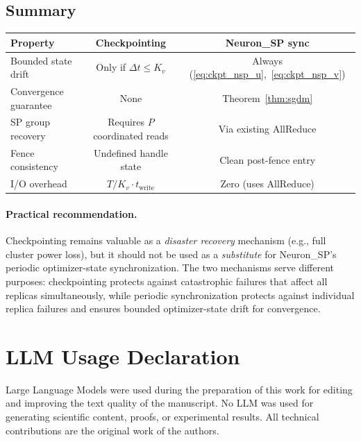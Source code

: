 \documentclass{article}
\begin{document}
\subsection{Summary}
\label{sec:checkpoint_summary}

\begin{center}
\begin{tabular}{lcc}
\toprule
\textbf{Property} & \textbf{Checkpointing} & \textbf{Neuron\_SP sync} \\
\midrule
Bounded state drift & Only if $\Delta t \leq K_v$ & Always (\eqref{eq:ckpt_nsp_u},~\eqref{eq:ckpt_nsp_v}) \\
Convergence guarantee & None & Theorem~\ref{thm:sgdm} \\
SP group recovery & Requires $P$ coordinated reads & Via existing AllReduce \\
Fence consistency & Undefined handle state & Clean post-fence entry \\
I/O overhead & $T/K_v \cdot t_{\text{write}}$ & Zero (uses AllReduce) \\
\bottomrule
\end{tabular}
\end{center}

\paragraph{Practical recommendation.}
Checkpointing remains valuable as a \emph{disaster recovery} mechanism
(e.g., full cluster power loss), but it should not be used as a
\emph{substitute} for Neuron\_SP's periodic optimizer-state
synchronization. The two mechanisms serve different purposes:
checkpointing protects against catastrophic failures that affect all
replicas simultaneously, while periodic synchronization protects against
individual replica failures and ensures bounded optimizer-state drift
for convergence.



\section{LLM Usage Declaration}
\label{sec:llm_usage}

Large Language Models were used during the preparation of this work for editing and improving the
text quality of the manuscript. No LLM was used for generating scientific content, proofs, or
experimental results. All technical contributions are the original work of the authors.
\end{document}
